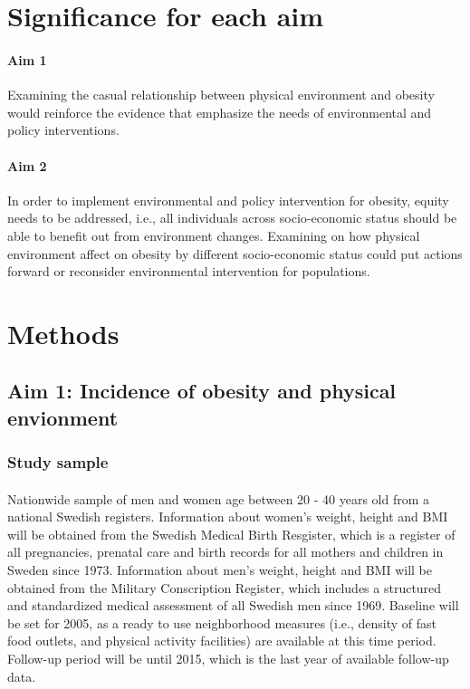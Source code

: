 \documentclass[12]{article}
\begin{document}
\newpage

\section{Significance for each aim}
\paragraph{Aim 1}
Examining the casual relationship between physical environment and obesity would reinforce the evidence that emphasize the needs of environmental and policy interventions. 

\paragraph{Aim 2}
In order to implement environmental and policy intervention for obesity, equity needs
to be addressed, i.e., all individuals across socio-economic status should be able to benefit out from environment changes. Examining on how physical environment affect on obesity by different socio-economic status could put actions forward or reconsider environmental intervention for populations.

\newpage

\section{Methods}
\subsection{Aim 1: Incidence of obesity and physical envionment}
\subsubsection{Study sample}
\paragraph{} Nationwide sample of men and women age between 20 - 40 years old from a national Swedish registers. Information about women's weight, height and BMI will be obtained from the Swedish Medical Birth Resgister, which is a register of all pregnancies, prenatal care and birth records for all mothers and children in Sweden since 1973. Information about men's weight, height and BMI will be obtained from the Military Conscription Register, which includes a structured and standardized medical assessment of all Swedish men since 1969. Baseline will be set for 2005, as a ready to use neighborhood measures (i.e., density of fast food outlets, and physical activity facilities) are available at this time period. Follow-up period will be until 2015, which is the last year of available follow-up data.
\end{document}
